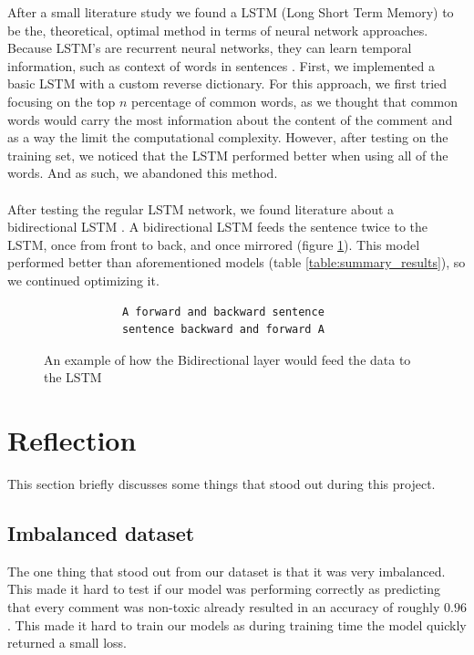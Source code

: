 \documentclass[10pt, a4paper]{article}
\begin{document}
\begin{multicols}{2}
		After a small literature study we found a LSTM (Long Short Term Memory) to be the, theoretical, optimal method in terms of neural network approaches. Because LSTM's are recurrent neural networks, they can learn temporal information, such as context of words in sentences \cite{zhou2016text}. First, we implemented a basic LSTM with a custom reverse dictionary. For this approach, we first tried focusing on the top $n$ percentage of common words, as we thought that common words would carry the most information about the content of the comment and as a way the limit the computational complexity. However, after testing on the training set, we noticed that the LSTM performed better when using all of the words. And as such, we abandoned this method.
		\\
		\\
		After testing the regular LSTM network, we found literature about a bidirectional LSTM \cite{zhou2016text}. A bidirectional LSTM feeds the sentence twice to the LSTM, once from front to back, and once mirrored (figure \ref{fig:example_input}). This model performed better than aforementioned models (table \ref{table:summary_results}), so we continued optimizing it.
		
		\begin{figure}[H]
		\centering
			\begin{verbatim}	
			A forward and backward sentence
			sentence backward and forward A
			\end{verbatim}
			\caption{An example of how the  Bidirectional layer would feed the data to the LSTM}
			\label{fig:example_input}
		\end{figure}
		\newpage
		\begin{minipage}{\linewidth}
		\section{Reflection}
		This section briefly discusses some things that stood out during this project.
		\subsection{Imbalanced dataset}
		The one thing that stood out from our dataset is that it was very imbalanced. This made it hard to test if our model was performing correctly as predicting that every comment was non-toxic already resulted in an accuracy of roughly $0.96$. This made it hard to train our models as during training time the model quickly returned a small loss.

\end{minipage}
\end{multicols}
\end{document}
